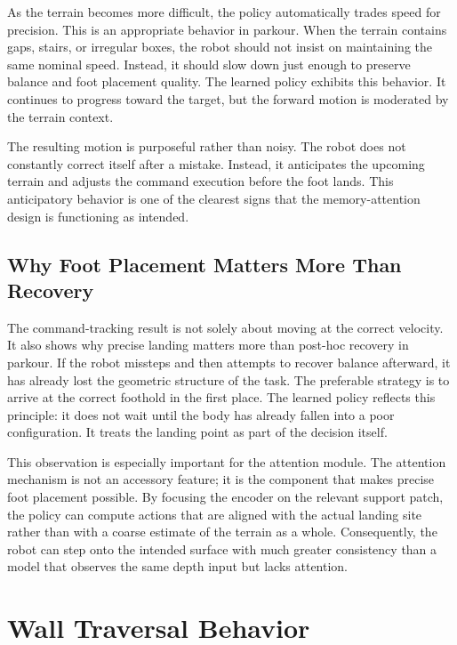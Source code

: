 As the terrain becomes more difficult, the policy automatically trades speed for precision. This is an appropriate behavior in parkour. When the terrain contains gaps, stairs, or irregular boxes, the robot should not insist on maintaining the same nominal speed. Instead, it should slow down just enough to preserve balance and foot placement quality. The learned policy exhibits this behavior. It continues to progress toward the target, but the forward motion is moderated by the terrain context.

The resulting motion is purposeful rather than noisy. The robot does not constantly correct itself after a mistake. Instead, it anticipates the upcoming terrain and adjusts the command execution before the foot lands. This anticipatory behavior is one of the clearest signs that the memory-attention design is functioning as intended.

\subsection{Why Foot Placement Matters More Than Recovery}
\label{sec:foot_placement_matters}

The command-tracking result is not solely about moving at the correct velocity. It also shows why precise landing matters more than post-hoc recovery in parkour. If the robot missteps and then attempts to recover balance afterward, it has already lost the geometric structure of the task. The preferable strategy is to arrive at the correct foothold in the first place. The learned policy reflects this principle: it does not wait until the body has already fallen into a poor configuration. It treats the landing point as part of the decision itself.

This observation is especially important for the attention module. The attention mechanism is not an accessory feature; it is the component that makes precise foot placement possible. By focusing the encoder on the relevant support patch, the policy can compute actions that are aligned with the actual landing site rather than with a coarse estimate of the terrain as a whole. Consequently, the robot can step onto the intended surface with much greater consistency than a model that observes the same depth input but lacks attention.

\section{Wall Traversal Behavior}
\label{sec:wall_traversal_behavior}

